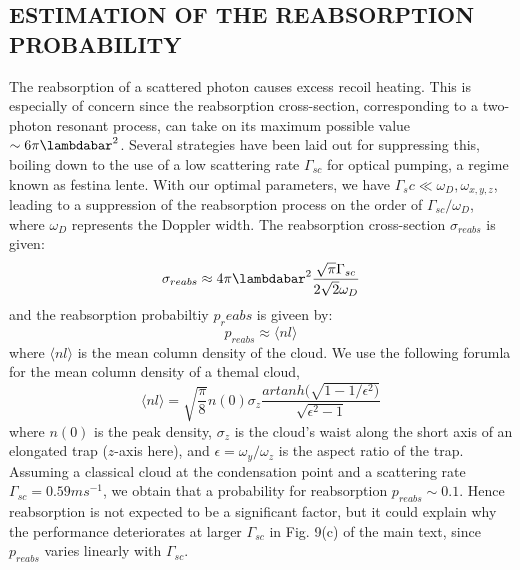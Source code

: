 \documentclass{article}
\begin{document}
\subsection{ESTIMATION OF THE REABSORPTION PROBABILITY}
The reabsorption of a scattered photon causes excess recoil heating. This is especially of concern since the reabsorption cross-section, corresponding to a two-photon resonant process, can take on its maximum possible value $\sim 6\pi \lambdabar^2$. Several strategies have been laid out for suppressing this, boiling down to the use of a low scattering rate $\Gamma_{sc}$ for optical pumping, a regime known as festina lente. With our optimal parameters, we have $\Gamma_sc \ll \omega_D, \omega_{x,y,z}$, leading to a suppression of the reabsorption process on the order of $\Gamma_{sc}/\omega_D$, where $\omega_D$ represents the Doppler width. The reabsorption cross-section $\sigma_{reabs}$ is given:
\begin{equation}
    \sigma_{reabs} \approx 4\pi \lambdabar^2 \frac{\sqrt{\pi} \Gamma_{sc}}{2 \sqrt{2} \omega_D}
\end{equation}
and the reabsorption probabiltiy $p_reabs$ is giveen by:
\begin{equation}
    p_{reabs} \approx \langle nl \rangle
\end{equation}
where $\langle nl \rangle$ is the mean column density of the cloud. We use the following forumla for the mean column density of a themal cloud,
\begin{equation}
    \langle nl \rangle = \sqrt{\frac{\pi}{8}}n(0) \sigma_z \frac{artanh (\sqrt{1-1/\epsilon^2)}}{\sqrt{\epsilon^2 - 1}}
\end{equation}
where $n(0)$ is the peak density, $\sigma_z$ is the cloud's waist along the short axis of an elongated trap ($z$-axis here), and $\epsilon = \omega_y / \omega_z$ is the aspect ratio of the trap. Assuming a classical cloud at the condensation point and a scattering rate $\Gamma_{sc} = 0.59 ms^{-1}$, we obtain that a probability for reabsorption $p_{reabs} \sim 0.1$. Hence reabsorption is not expected to be a significant factor, but it could explain why the performance deteriorates at larger $\Gamma_{sc}$ in Fig. 9(c) of the main text, since $p_{reabs}$ varies linearly with $\Gamma_{sc}$.
\end{document}
